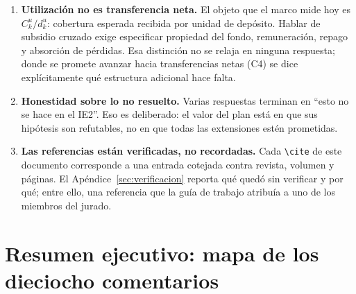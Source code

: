 \documentclass[11pt]{article}
\theoremstyle{definition}
\begin{document}
\begin{enumerate}[leftmargin=*]
\item \textbf{Utilizaci\'on no es transferencia neta.} El objeto que el marco
mide hoy es $C^u_k/d^u_k$: cobertura esperada recibida por unidad de dep\'osito.
Hablar de subsidio cruzado exige especificar propiedad del fondo, remuneraci\'on,
repago y absorci\'on de p\'erdidas. Esa distinci\'on no se relaja en ninguna
respuesta; donde se promete avanzar hacia transferencias netas (C4) se dice
expl\'icitamente qu\'e estructura adicional hace falta.

\item \textbf{Honestidad sobre lo no resuelto.} Varias respuestas terminan en
``esto no se hace en el IE2''. Eso es deliberado: el valor del plan est\'a en
que sus hip\'otesis son refutables, no en que todas las extensiones est\'en
prometidas.

\item \textbf{Las referencias est\'an verificadas, no recordadas.} Cada
\texttt{\textbackslash cite} de este documento corresponde a una entrada cotejada
contra revista, volumen y p\'aginas. El Ap\'endice~\ref{sec:verificacion}
reporta qu\'e qued\'o sin verificar y por qu\'e; entre ello, una referencia que
la gu\'ia de trabajo atribu\'ia a uno de los miembros del jurado.
\end{enumerate}

\section{Resumen ejecutivo: mapa de los dieciocho comentarios}
\end{document}
